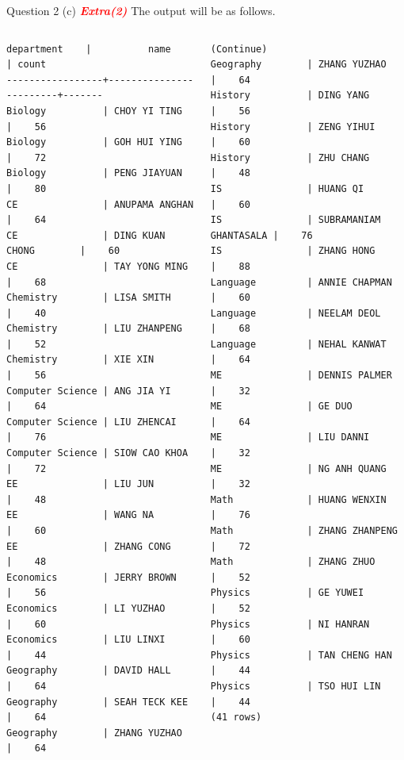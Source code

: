 \begin{frame}[fragile]{Question 2 (c) \textcolor{red}{\textit{\textbf{Extra(2)}}}}
The output will be as follows.

\begin{columns}[t]
	
\begin{lstlisting}[style=terminal-tiny]
   department    |          name          | count 
-----------------+------------------------+-------
Biology          | CHOY YI TING           |    56
Biology          | GOH HUI YING           |    72
Biology          | PENG JIAYUAN           |    80
CE               | ANUPAMA ANGHAN         |    64
CE               | DING KUAN CHONG        |    60
CE               | TAY YONG MING          |    68
Chemistry        | LISA SMITH             |    40
Chemistry        | LIU ZHANPENG           |    52
Chemistry        | XIE XIN                |    56
Computer Science | ANG JIA YI             |    64
Computer Science | LIU ZHENCAI            |    76
Computer Science | SIOW CAO KHOA          |    72
EE               | LIU JUN                |    48
EE               | WANG NA                |    60
EE               | ZHANG CONG             |    48
Economics        | JERRY BROWN            |    56
Economics        | LI YUZHAO              |    60
Economics        | LIU LINXI              |    44
Geography        | DAVID HALL             |    64
Geography        | SEAH TECK KEE          |    64
Geography        | ZHANG YUZHAO           |    64
\end{lstlisting}

\begin{lstlisting}[style=terminal-tiny]
(Continue)
Geography        | ZHANG YUZHAO           |    64
History          | DING YANG              |    56
History          | ZENG YIHUI             |    60
History          | ZHU CHANG              |    48
IS               | HUANG QI               |    60
IS               | SUBRAMANIAM GHANTASALA |    76
IS               | ZHANG HONG             |    88	
Language         | ANNIE CHAPMAN          |    60
Language         | NEELAM DEOL            |    68
Language         | NEHAL KANWAT           |    64
ME               | DENNIS PALMER          |    32
ME               | GE DUO                 |    64
ME               | LIU DANNI              |    32
ME               | NG ANH QUANG           |    32
Math             | HUANG WENXIN           |    76
Math             | ZHANG ZHANPENG         |    72
Math             | ZHANG ZHUO             |    52
Physics          | GE YUWEI               |    52
Physics          | NI HANRAN              |    60
Physics          | TAN CHENG HAN          |    44
Physics          | TSO HUI LIN            |    44
(41 rows)
\end{lstlisting}
\end{columns}

\end{frame}

